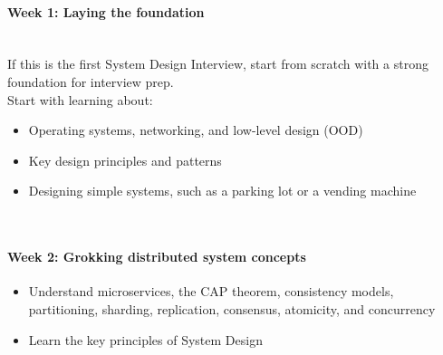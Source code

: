 \paragraph{Week 1: Laying the foundation}\label{MiFmt3qCz5W6-hzzFmLlX}
\\
If this is the first System Design Interview, start from scratch with a strong foundation for interview prep.
\\
Start with learning about:

\begin{itemize}
\item
\protect{}\label{czqVPfvooEx6ROhQtfNm-}
Operating systems, networking, and low-level design (OOD)
\item
\protect{}\label{ecELwgnS6DkLY97yRTUKx}
Key design principles and patterns
\item
\protect{}\label{Sekt1WrHLMjMpD4-R1-Kt}
Designing simple systems, such as a parking lot or a vending machine
\end{itemize}
\\
\paragraph{Week 2: Grokking distributed system concepts}\label{Jmxvn337WxBNpVPR21Ytm}

\begin{itemize}
\item
\protect{}\label{IkwRkJObFk1NuJrvzjMhd}
Understand microservices, the CAP theorem, consistency models, partitioning, sharding, replication, consensus, atomicity, and concurrency
\item
\protect{}\label{byfeloKr9jEHxvpBq8JyW}
Learn the key principles of System Design
\end{itemize}

\begin{center}
\end{center}

